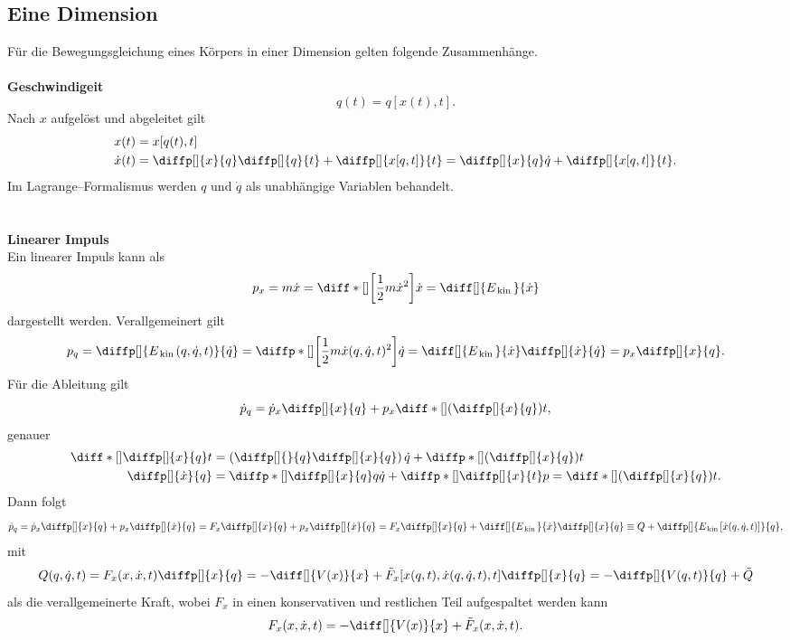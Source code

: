 \documentclass[a4paper,12pt]{article}
\numberwithin{equation}{section}
\begin{document}
\subsection{Eine Dimension}
Für die Bewegungsgleichung eines Körpers in einer Dimension gelten folgende Zusammenhänge.
\\\hfill\\\textbf{Geschwindigeit}\\ 
\[ 
        q(t)=q[x(t),t]
.\] 
Nach $x$ aufgelöst und abgeleitet gilt
\begin{align*}
        x(t)&=x[q(t),t]\\
        \dot{x}(t)&=\diffp[]{x}{q}\diffp[]{q}{t}+\diffp[]{x[q,t]}{t}=\diffp[]{x}{q}\dot{q}+\diffp[]{x[q,t]}{t}
.\end{align*}
Im Lagrange--Formalismus werden $q$ und $\dot{q}$ als unabhängige Variablen behandelt.\\\indent
\\\hfill\\\textbf{Linearer Impuls}\\ 
Ein linearer Impuls kann als 
\[ 
        p_x=m\dot{x}=\diff*[]{\left[\dfrac{1}{2}m\dot{x}^2\right]}{\dot{x}}=\diff[]{E_{\,\text{kin}\,}}{\dot{x}}
\] 
dargestellt werden. Verallgemeinert gilt
\[ 
        p_q=\diffp[]{E_{\,\text{kin}\,}(q,\dot{q},t)}{\dot{q}}=\diffp*[]{\left[\dfrac{1}{2}m\dot{x}(q,\dot{q},t)^2\right]}{\dot{q}}=\diff[]{E_{\,\text{kin}\,}}{\dot{x}}\diffp[]{\dot{x}}{\dot{q}}=p_x\diffp[]{x}{q}
.\] 
Für die Ableitung gilt
\[ 
        \dot{p}_q=\dot{p}_x\diffp[]{x}{q}+p_x\diff*[]{\left(\diffp[]{x}{q}\right)}{t}
,\] 
genauer
\begin{align*}
        \diff*[]{\diffp[]{x}{q}}{t}&=\left(\diffp[]{}{q}\diffp[]{x}{q}\right)\dot{q}+\diffp*[]{\left(\diffp[]{x}{q}\right)}{t}\\
        \diffp[]{\dot{x}}{q}&=\diffp*[]{\diffp[]{x}{q}}{q}\dot{q}+\diffp*[]{\diffp[]{x}{t}}{p}=\diff*[]{\left(\diffp[]{x}{q}\right)}{t}
.\end{align*}
Dann folgt 
\[ 
        \dot{p}_q=\dot{p}_x\diffp[]{x}{q}+p_x\diffp[]{\dot{x}}{q}=F_x\diffp[]{x}{q}+p_x\diffp[]{\dot{x}}{q}=F_x\diffp[]{x}{q}+\diff[]{E_{\,\text{kin}\,}}{\dot{x}}\diffp[]{x}{q}\equiv Q+\diffp[]{E_{\,\text{kin}\,}[\dot{x}(q,\dot{q},t)]}{q}
,\] 
mit 
\[ 
        Q(q,\dot{q},t)=F_x(x,\dot{x},t)\diffp[]{x}{q}=-\diff[]{V(x)}{x}+\tilde F_x[x(q,t),\dot{x}(q,\dot{q},t),t]\diffp[]{x}{q}=-\diffp[]{V(q,t)}{q}+\tilde Q
\] 
als die verallgemeinerte Kraft, wobei $F_x$ in einen konservativen und restlichen Teil aufgespaltet werden kann
\[ 
        F_x(x,\dot{x},t)=-\diff[]{V(x)}{x}+\tilde F_x(x,\dot{x},t)
.\] 
\end{document}
